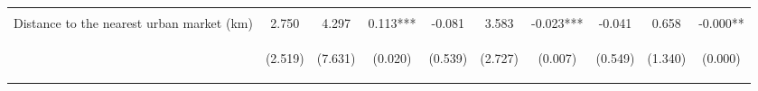 \begin{center}
\begin{tabular}{lccccccccc}
\vspace{4pt} & \begin{footnotesize}[0.376]\end{footnotesize} & \begin{footnotesize}[0.683]\end{footnotesize} & \begin{footnotesize}[0.000]\end{footnotesize} & \begin{footnotesize}[0.232]\end{footnotesize} & \begin{footnotesize}[0.370]\end{footnotesize} & \begin{footnotesize}[0.435]\end{footnotesize} & \begin{footnotesize}[0.420]\end{footnotesize} & \begin{footnotesize}[0.491]\end{footnotesize} & \begin{footnotesize}[0.000]\end{footnotesize} \\
Distance to the nearest urban market (km) & 2.750 & 4.297 & 0.113*** & -0.081 & 3.583 & -0.023*** & -0.041 & 0.658 & -0.000** \\
 & \begin{footnotesize}(2.519)\end{footnotesize} & \begin{footnotesize}(7.631)\end{footnotesize} & \begin{footnotesize}(0.020)\end{footnotesize} & \begin{footnotesize}(0.539)\end{footnotesize} & \begin{footnotesize}(2.727)\end{footnotesize} & \begin{footnotesize}(0.007)\end{footnotesize} & \begin{footnotesize}(0.549)\end{footnotesize} & \begin{footnotesize}(1.340)\end{footnotesize} & \begin{footnotesize}(0.000)\end{footnotesize} \\

\end{tabular}
\end{center}
